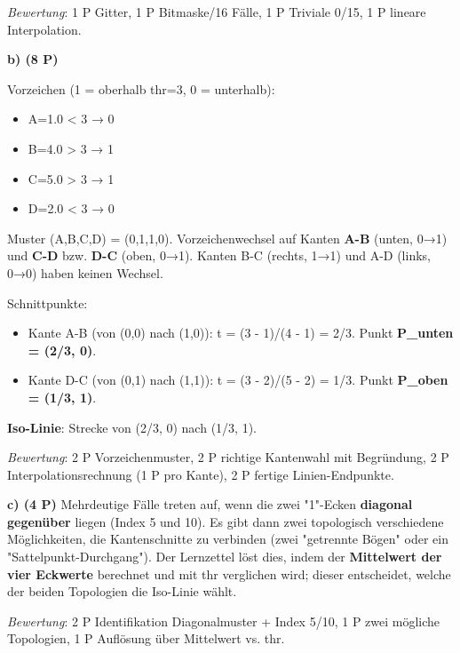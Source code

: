 \documentclass[11pt, a4paper]{article}
\begin{document}
\textit{Bewertung}: 1 P Gitter, 1 P Bitmaske/16 Fälle, 1 P Triviale 0/15, 1 P lineare Interpolation.


\textbf{b) (8 P)}


Vorzeichen (1 = oberhalb thr=3, 0 = unterhalb):

\begin{itemize}
  \item A=1.0 < 3 → 0
  \item B=4.0 > 3 → 1
  \item C=5.0 > 3 → 1
  \item D=2.0 < 3 → 0
\end{itemize}

Muster (A,B,C,D) = (0,1,1,0). Vorzeichenwechsel auf Kanten \textbf{A-B} (unten, 0→1) und \textbf{C-D} bzw. \textbf{D-C} (oben, 0→1). Kanten B-C (rechts, 1→1) und A-D (links, 0→0) haben keinen Wechsel.


Schnittpunkte:

\begin{itemize}
  \item Kante A-B (von (0,0) nach (1,0)): t = (3 - 1)/(4 - 1) = 2/3. Punkt \textbf{P\_unten = (2/3, 0)}.
  \item Kante D-C (von (0,1) nach (1,1)): t = (3 - 2)/(5 - 2) = 1/3. Punkt \textbf{P\_oben = (1/3, 1)}.
\end{itemize}

\textbf{Iso-Linie}: Strecke von (2/3, 0) nach (1/3, 1).


\textit{Bewertung}: 2 P Vorzeichenmuster, 2 P richtige Kantenwahl mit Begründung, 2 P Interpolationsrechnung (1 P pro Kante), 2 P fertige Linien-Endpunkte.


\textbf{c) (4 P)} Mehrdeutige Fälle treten auf, wenn die zwei "1"-Ecken \textbf{diagonal gegenüber} liegen (Index 5 und 10). Es gibt dann zwei topologisch verschiedene Möglichkeiten, die Kantenschnitte zu verbinden (zwei "getrennte Bögen" oder ein "Sattelpunkt-Durchgang"). Der Lernzettel löst dies, indem der \textbf{Mittelwert der vier Eckwerte} berechnet und mit thr verglichen wird; dieser entscheidet, welche der beiden Topologien die Iso-Linie wählt.


\textit{Bewertung}: 2 P Identifikation Diagonalmuster + Index 5/10, 1 P zwei mögliche Topologien, 1 P Auflösung über Mittelwert vs. thr.





\end{document}
